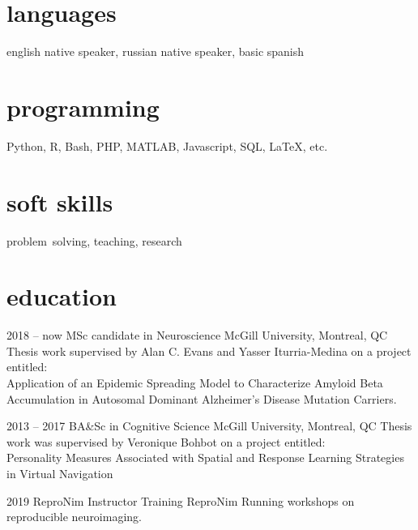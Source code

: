 \documentclass[]{friggeri-cv} %
\begin{document}
\begin{aside}
\section{languages}
english native speaker,
russian native speaker,
basic spanish
\section{programming}
Python, R, Bash, PHP,
MATLAB, Javascript,
SQL, LaTeX, etc.
\section{soft skills}
problem~solving, teaching, research
\end{aside}


\section{education}

\begin{entrylist}


\entry
{2018 -- now}
{MSc candidate {\normalfont in Neuroscience}}
{McGill University, Montreal, QC}
{Thesis work supervised by Alan C. Evans and Yasser Iturria-Medina on a project entitled:\\ 
Application of an Epidemic Spreading Model to Characterize Amyloid Beta Accumulation in Autosomal Dominant Alzheimer’s Disease Mutation Carriers.
}

\entry
{2013 -- 2017}
{BA\&Sc {\normalfont in Cognitive Science}}
{McGill University, Montreal, QC}
{Thesis work was supervised by Veronique Bohbot on a project entitled:\\ 
Personality Measures Associated with Spatial and Response Learning Strategies
in Virtual Navigation}


\entry
{2019}
{ReproNim Instructor Training}
{ReproNim}
{Running workshops on reproducible neuroimaging.}

\end{entrylist}

\end{document}
